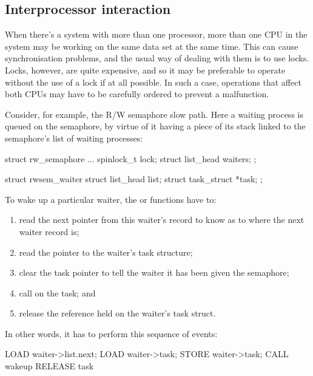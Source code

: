 \subsection{Interprocessor interaction}

When there's a system with more than one processor, more than one CPU in the
system may be working on the same data set at the same time.
This can cause synchronisation problems, and the usual way of dealing with
them is to use locks.
Locks, however, are quite expensive, and so it may be preferable to operate
without the use of a lock if at all possible.
In such a case, operations that affect both CPUs may have to be carefully
ordered to prevent a malfunction.

Consider, for example, the R/W semaphore slow path.
Here a waiting process is queued on the semaphore, by virtue of it having
a piece of its stack linked to the semaphore's list of waiting processes:

\begin{VerbatimU}
	struct rw_semaphore {
		...
		spinlock_t lock;
		struct list_head waiters;
	};

	struct rwsem_waiter {
		struct list_head list;
		struct task_struct *task;
	};
\end{VerbatimU}

To wake up a particular waiter, the  or 
functions have to:

\begin{enumerate}
 \item
     read the next pointer from this waiter's record to know as to where the
     next waiter record is;

 \item
     read the pointer to the waiter's task structure;

 \item
     clear the task pointer to tell the waiter it has been given the semaphore;

 \item
     call  on the task; and

 \item
     release the reference held on the waiter's task struct.
\end{enumerate}

In other words, it has to perform this sequence of events:

\begin{VerbatimU}
	LOAD waiter->list.next;
	LOAD waiter->task;
	STORE waiter->task;
	CALL wakeup
	RELEASE task
\end{VerbatimU}

